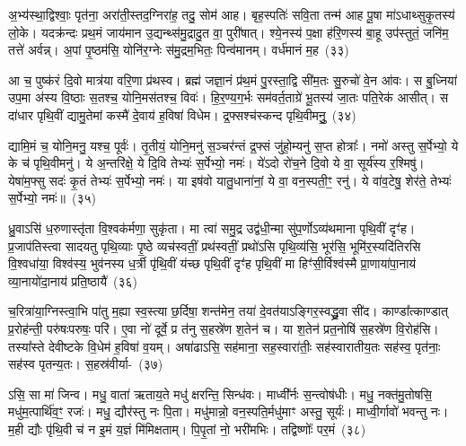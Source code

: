 {\anuvakamend[{आ मन्द॑स्व सान॒सिमेका॒न्नच॑त्वारि॒ꣳ॒शच्च॑}]}

अ॒भ्य॑स्था॒द्विश्वाः॒ पृत॑ना॒ अरा॑ती॒स्तद॒ग्निरा॑ह॒ तदु॒ सोम॑ आह। बृह॒स्पतिः॑ सवि॒ता तन्म॑ आह पू॒षा मा॑\-ऽ\-धाथ्सुकृ॒तस्य॑ लो॒के। यदक्र॑न्दः प्रथ॒मं जाय॑मान उ॒द्यन्थ्स॑मु॒द्रादु॒त वा॒ पुरी॑षात्। श्ये॒नस्य॑ प॒क्षा ह॑रि॒णस्य॑ बा॒हू उप॑स्तुतं॒ जनि॑म॒ तत्ते॑ अर्वन्न्। अ॒पां पृ॒ष्ठम॑सि॒ योनि॑र॒ग्नेः स॑मु॒द्रम॒भितः॒ पिन्व॑मानम्। वर्ध॑मानं म॒ह~(३३)\ip

आ च॒ पुष्क॑रं दि॒वो मात्र॑या वरि॒णा प्र॑थस्व। ब्रह्म॑ जज्ञा॒नं प्र॑थ॒मं पु॒रस्ता॒द्वि सी॑म॒तः सु॒रुचो॑ वे॒न आ॑वः। स बु॒ध्निया॑ उप॒मा अ॑स्य वि॒ष्ठाः स॒तश्च॒ योनि॒मस॑तश्च॒ विवः॑। हि॒र॒ण्य॒ग॒र्भः सम॑वर्त॒ताग्रे॑ भू॒तस्य॑ जा॒तः पति॒रेक॑ आसीत्। स दा॑धार पृथि॒वीं द्यामु॒तेमां कस्मै॑ दे॒वाय॑ ह॒विषा॑ विधेम। द्र॒फ्सश्च॑स्कन्द पृथि॒वीमनुु॒~(३४)\ip

द्यामि॒मं च॒ योनि॒मनु॒ यश्च॒ पूर्वः॑। तृ॒तीयं॒ योनि॒मनु॑ स॒ञ्चर॑न्तं द्र॒फ्सं जु॑हो॒म्यनु॑ स॒प्त होत्राः᳚। नमो॑ अस्तु स॒र्पेभ्यो॒ ये के च॑ पृथि॒वीमनु॑। ये अ॒न्तरि॑क्षे॒ ये दि॒वि तेभ्यः॑ स॒र्पेभ्यो॒ नमः॑। ये॑\-ऽदो रो॑च॒ने दि॒वो ये वा॒ सूर्य॑स्य र॒श्मिषु॑। येषा॑म॒फ्सु सदः॑ कृ॒तं तेभ्यः॑ स॒र्पेभ्यो॒ नमः॑। या इष॑वो यातु॒धाना॑नां॒ ये वा॒ वन॒स्पती॒ꣳ॒ रनु॑। ये वा॑व॒टेषु॒ शेर॑ते॒ तेभ्यः॑ स॒र्पेभ्यो॒ नमः॑॥~(३५)\ip

{\anuvakamend[{म॒हो\-ऽनु॑ यातु॒धाना॑ना॒मेका॑\-दश च}]}

ध्रु॒वाऽसि॑ ध॒रुणास्तृ॑ता वि॒श्वक॑र्मणा॒ सुकृ॑ता। मा त्वा॑ समु॒द्र उद्व॑धी॒न्मा सु॑प॒र्णो\-ऽव्य॑थमाना पृथि॒वीं दृꣳ॑ह। प्र॒जा\-प॑तिस्त्वा सादयतु पृथि॒व्याः पृ॒ष्ठे व्यच॑स्वतीं॒ प्रथ॑स्वतीं॒ प्रथो॑\-ऽसि पृथि॒व्य॑सि॒ भूर॑सि॒ भूमि॑र॒स्यदि॑तिरसि वि॒श्वधा॑या॒ विश्व॑स्य॒ भुव॑नस्य ध॒र्त्री पृ॑थि॒वीं य॑च्छ पृथि॒वीं दृꣳ॑ह पृथि॒वीं मा हिꣳ॑सी॒र्विश्व॑स्मै प्रा॒णाया॑पा॒नाय॑ व्या॒नायो॑दा॒नाय॑ प्रति॒ष्ठायै॑~(३६)\ip

च॒रित्रा॑या॒ग्निस्त्वा॒भि पा॑तु म॒ह्या स्व॒स्त्या छ॒र्दिषा॒ शन्त॑मेन॒ तया॑ दे॒वत॑या\-ऽ\-ङ्गिर॒स्वद्ध्रु॒वा सी॑द। काण्डा᳚त्काण्डात् प्र॒रोह॑न्ती॒ परु॑षःपरुषः॒ परि॑। ए॒वा नो॑ दूर्वे॒ प्र त॑नु स॒हस्रे॑ण श॒तेन॑ च। या श॒तेन॑ प्रत॒नोषि॑ स॒हस्रे॑ण वि॒रोह॑सि। तस्या᳚स्ते देवीष्टके वि॒धेम॑ ह॒विषा॑ व॒यम्। अषा॑ढाऽसि॒ सह॑माना॒ सह॒स्वारा॑तीः॒ सह॑स्वारातीय॒तः सह॑स्व॒ पृत॑नाः॒ सह॑स्व पृतन्य॒तः। स॒हस्र॑वीर्या-~(३७)\ip

ऽसि॒ सा मा॑ जिन्व। मधु॒ वाता॑ ऋताय॒ते मधु॑ क्षरन्ति॒ सिन्ध॑वः। माध्वी᳚र्नः स॒न्त्वोष॑धीः। मधु॒ नक्त॑मु॒तोषसि॒ मधु॑म॒त्पार्थि॑व॒ꣳ॒ रजः॑। मधु॒ द्यौर॑स्तु नः पि॒ता। मधु॑मान्नो॒ वन॒स्पति॒र्मधु॑माꣳ अस्तु॒ सूर्यः॑। माध्वी॒र्गावो॑ भवन्तु नः। म॒ही द्यौः पृ॑थि॒वी च॑ न इ॒मं य॒ज्ञं मि॑मिक्षताम्। पि॒पृ॒तां नो॒ भरी॑मभिः। तद्विष्णोः᳚ पर॒मं~(३८)\ip

